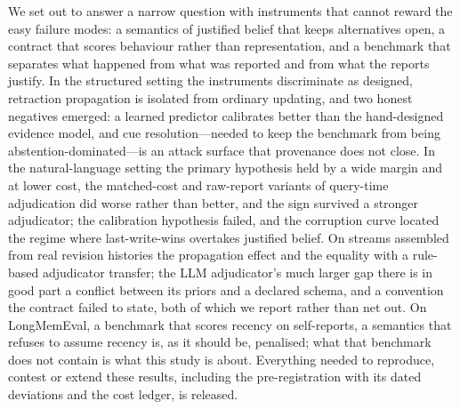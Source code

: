 We set out to answer a narrow question with instruments that cannot reward the easy failure modes: a semantics of justified belief that keeps alternatives open, a contract that scores behaviour rather than representation, and a benchmark that separates what happened from what was reported and from what the reports justify. In the structured setting the instruments discriminate as designed, retraction propagation is isolated from ordinary updating, and two honest negatives emerged: a learned predictor calibrates better than the hand-designed evidence model, and cue resolution---needed to keep the benchmark from being abstention-dominated---is an attack surface that provenance does not close. In the natural-language setting the primary hypothesis held by a wide margin and at lower cost, the matched-cost and raw-report variants of query-time adjudication did worse rather than better, and the sign survived a stronger adjudicator; the calibration hypothesis failed, and the corruption curve located the regime where last-write-wins overtakes justified belief. On streams assembled from real revision histories the propagation effect and the equality with a rule-based adjudicator transfer; the LLM adjudicator's much larger gap there is in good part a conflict between its priors and a declared schema, and a convention the contract failed to state, both of which we report rather than net out. On LongMemEval, a benchmark that scores recency on self-reports, a semantics that refuses to assume recency is, as it should be, penalised; what that benchmark does not contain is what this study is about. Everything needed to reproduce, contest or extend these results, including the pre-registration with its dated deviations and the cost ledger, is released.
